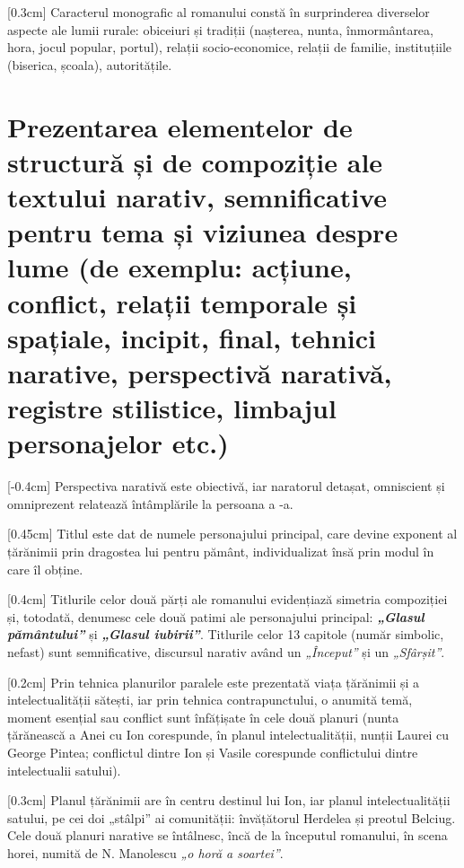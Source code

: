 [0.3cm]
Caracterul monografic al romanului constă în surprinderea diverselor aspecte ale lumii rurale: obiceiuri și tradiții (nașterea, nunta, înmormântarea, hora, jocul popular, portul), relații socio-economice, relații de familie, instituțiile (biserica, școala), autoritățile.


\section{Prezentarea elementelor de structură și de compoziție ale textului narativ, semnificative pentru tema și viziunea despre lume {\footnotesize\normalfont (de exemplu: acțiune, conflict, relații temporale și spațiale, incipit, final, tehnici narative, perspectivă narativă, registre stilistice, limbajul personajelor etc.)}}

[-0.4cm]
Perspectiva narativă este obiectivă, iar naratorul detașat, omniscient și omniprezent relatează întâmplările la persoana a -a.

[0.45cm]
Titlul este dat de numele personajului principal, care devine exponent al țărănimii prin dragostea lui pentru pământ, individualizat însă prin modul în care îl obține.

[0.4cm]
Titlurile celor două părți ale romanului evidențiază simetria compoziției și, totodată, denumesc cele două patimi ale personajului principal: \textbf{\textit{„Glasul pământului”}} și \textbf{\textit{„Glasul iubirii”}}. Titlurile celor 13 capitole (număr simbolic, nefast) sunt semnificative, discursul narativ având un \textit{„Început”} și un \textit{„Sfârșit”}.

[0.2cm]
Prin tehnica planurilor paralele este prezentată viața țărănimii și a intelectualității sătești, iar prin tehnica contrapunctului, o anumită temă, moment esențial sau conflict sunt înfățișate în cele două planuri (nunta țărănească a Anei cu Ion corespunde, în planul intelectualității, nunții Laurei cu George Pintea;
conflictul dintre Ion și Vasile corespunde conflictului dintre intelectualii satului).

[0.3cm]
Planul țărănimii are în centru destinul lui Ion, iar planul intelectualității satului, pe cei doi „stâlpi” ai comunității: învățătorul Herdelea și preotul Belciug. Cele două planuri narative se întâlnesc, încă de la începutul romanului, în scena horei, numită de N. Manolescu \textit{„o horă a soartei”}.

